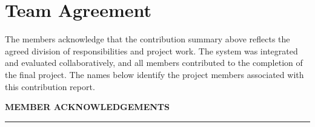 \documentclass[10pt,a4paper]{article}
\renewcommand{\arraystretch}{1.15}
\begin{document}
\needspace{10cm}

\section*{\color{darkgreen}Team Agreement}

The members acknowledge that the contribution summary above reflects the agreed
division of responsibilities and project work. The system was integrated and
evaluated collaboratively, and all members contributed to the completion of the
final project. The names below identify the project members associated with this
contribution report.

\vspace{12pt}


\begin{center}

{\small\bfseries\color{signaturegray}
MEMBER ACKNOWLEDGEMENTS}

\vspace{3pt}

{\color{lightgreen}\rule{0.32\textwidth}{1.2pt}}

\end{center}

\vspace{9pt}

\renewcommand{\arraystretch}{1}
\end{document}

